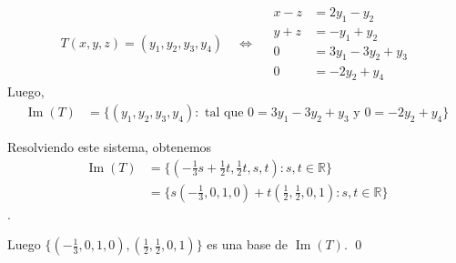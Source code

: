 \documentclass[handout]{beamer} %
\newcommand{\img}{\operatorname{Im}}
\newcommand{\nuc}{\operatorname{Nu}}
\newcommand{\R}{\mathbb R}
\begin{document}


        

        \begin{frame}
            
            \begin{equation*}\label{eq-gen}
                T(x,y,z) = (y_1,y_2,y_3,y_4) \quad\Leftrightarrow \quad
                \begin{array}{rl}
                x -z &= 2y_1-y_2\\ 
                y +z &= -y_1+y_2\\
                0&=3y_1-3y_2+y_3 \\
                0&= -2y_2 +y_4
                \end{array}
                \end{equation*} 
            Luego, 
            \begin{align*}
                \img(T) &=  \{(y_1,y_2,y_3,y_4): \text{ tal que $0=3y_1-3y_2+y_3$ y $0= -2y_2 +y_4$} \} 
            \end{align*}
            
            
            Resolviendo este sistema, obtenemos
            \begin{align*}
                \img(T) &=  \{(-\frac13 s + \frac12 t, \frac 12 t, s,t): s,t \in \R \}\\
                &=  \{s(-\frac13,0,1,0)+t(\frac12,\frac12,0,1): s,t \in \R \}
            \end{align*}
            .
            
            Luego $\{(-\frac13,0,1,0),(\frac12,\frac12,0,1) \}$ es una base de $\img(T)$. \qed
            
           
\end{frame}
\end{document}
